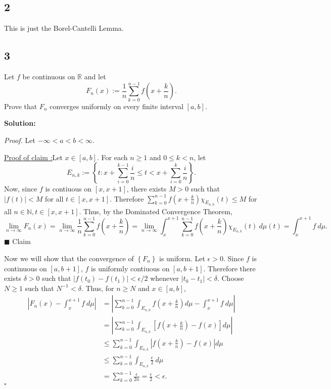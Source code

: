 \documentclass[12pt]{article}
\newcounter{ProofCounter}
\newcounter{ClaimCounter}[ProofCounter]
\newenvironment{Proof}{\stepcounter{ProofCounter}\textit{Proof.}}{\hfill$\square$}
\newenvironment{claim}[1]{\vspace{3mm}\stepcounter{ClaimCounter}\par\noindent\underline{\bf Claim \theClaimCounter:}\space#1}{}
\newenvironment{claimproof}[1]{\par\noindent\underline{Proof of claim \theClaimCounter:}\space#1}{\hfill $\blacksquare$ Claim \theClaimCounter}
\begin{document}
\subsection*{2}
This is just the Borel-Cantelli Lemma.

\newpage
\subsection*{3}
Let $f$ be continuous on $\mathbb{R}$ and let 
\[ F_{n}(x) := \frac{1}{n}\sum_{k=0}^{n-1}f\left( x + \frac{k}{n} \right). \]
Prove that $F_{n}$ converges uniformly on every finite interval $[a,b]$.

{\bf Solution:}

\begin{Proof}
Let $-\infty < a < b < \infty$.

\begin{claimproof}
Let $x \in [a,b]$. For each $n \geq 1$ and $0 \leq k < n$, let 
\[ E_{n,k} := \left\{ t : x + \sum_{i=0}^{k-1}\frac{i}{n} \leq t < x + \sum_{i=0}^{k}\frac{i}{n} \right\}. \]
Now, since $f$ is contiuous on $[x,x+1]$, there exists $M > 0$ such that $|f(t)| < M$ for all $t \in [x,x+1]$. Therefore $\sum_{k=0}^{n-1}f\left(
x + \frac{k}{n} \right)\chi_{E_{n,k}}(t) \leq M$ for all $n \in \mathbb{N}, t \in [x,x+1]$. Thus, by the Dominated Convergence Theorem,
\[ \lim_{n\rightarrow\infty}F_{n}(x) = \lim_{n\rightarrow\infty}\frac{1}{n}\sum_{k=0}^{n-1}f\left( x + \frac{k}{n} \right) = \lim_{n\rightarrow\infty}
\int_{x}^{x+1} \sum_{k=0}^{n-1}f\left( x + \frac{k}{n} \right)\chi_{E_{n,k}}(t)\ d\mu(t) = \int_{x}^{x+1}f\ d\mu. \]
\end{claimproof}

Now we will show that the convergence of $\left\{ F_{n} \right\}$ is uniform. Let $\epsilon > 0$. Since $f$ is continuous on $[a,b+1]$, $f$ is
uniformly contiuous on $[a,b+1]$. Therefore there exists $\delta > 0$ such that $|f(t_{0}) - f(t_{1})| < \epsilon/2$ whenever $|t_{0} - t_{1}| <
\delta$. Choose $N \geq 1$ such that $N^{-1} < \delta$. Thus, for $n \geq N$ and $x \in [a,b]$,
\begin{align*}
\left| F_{n}(x) - \int_{x}^{x+1}f\ d\mu \right| & = \left| \sum_{k=0}^{n-1} \int_{E_{n,k}}f\left( x + \frac{k}{n} \right)d\mu - \int_{x}^{x+1}f\
d\mu\right| \\
& = \left| \sum_{k=0}^{n-1}\int_{E_{n,k}}\left[f\left( x + \frac{k}{n} \right) - f(x)\right] d\mu \right| \\
& \leq \sum_{k=0}^{n-1}\int_{E_{n,k}}\left|f\left( x + \frac{k}{n} \right) - f(x)\right|d\mu \\
& \leq \sum_{k=0}^{n-1} \int_{E_{n,k}} \frac{\epsilon}{2}\ d\mu \\
& = \sum_{k=0}^{n-1}\frac{\epsilon}{2n} = \frac{\epsilon}{2} < \epsilon.
\end{align*}
\end{Proof}
\end{document}
